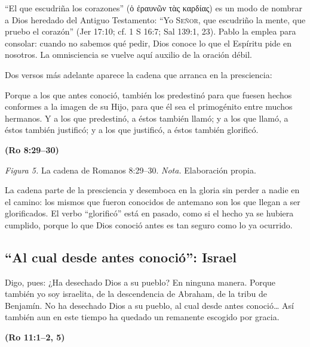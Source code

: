 \documentclass[11pt,letterpaper]{article}
\newcommand{\grc}[1]{\foreignlanguage{ancientgreek}{#1}}
\newcommand{\SENOR}{\textsc{Señor}}
\newcommand{\fuente}[1]{\par\hfill{\upshape\bfseries\small\textcolor{azul}{#1}}}
\begin{document}
``El que escudriña los corazones'' (\grc{ὁ ἐραυνῶν τὰς καρδίας}) es un modo de nombrar a Dios heredado del Antiguo Testamento: ``Yo \SENOR{}, que escudriño la mente, que pruebo el corazón'' (Jer 17:10; cf. 1 S 16:7; Sal 139:1, 23). Pablo la emplea para consolar: cuando no sabemos qué pedir, Dios conoce lo que el Espíritu pide en nosotros. La omnisciencia se vuelve aquí auxilio de la oración débil.

Dos versos más adelante aparece la cadena que arranca en la presciencia:

\begin{cita}Porque a los que antes conoció, también los predestinó para que fuesen hechos conformes a la imagen de su Hijo, para que él sea el primogénito entre muchos hermanos. Y a los que predestinó, a éstos también llamó; y a los que llamó, a éstos también justificó; y a los que justificó, a éstos también glorificó.\fuente{(Ro 8:29--30)}\end{cita}

\begin{center}
\par
{\footnotesize\color{gris}\textit{Figura 5.} La cadena de Romanos 8:29--30. \textit{Nota.} Elaboración propia.}
\end{center}

La cadena parte de la presciencia y desemboca en la gloria sin perder a nadie en el camino: los mismos que fueron conocidos de antemano son los que llegan a ser glorificados. El verbo ``glorificó'' está en pasado, como si el hecho ya se hubiera cumplido, porque lo que Dios conoció antes es tan seguro como lo ya ocurrido.

\subsection{``Al cual desde antes conoció'': Israel}

\begin{cita}Digo, pues: ¿Ha desechado Dios a su pueblo? En ninguna manera. Porque también yo soy israelita, de la descendencia de Abraham, de la tribu de Benjamín. No ha desechado Dios a su pueblo, al cual desde antes conoció\ldots{} Así también aun en este tiempo ha quedado un remanente escogido por gracia.\fuente{(Ro 11:1--2, 5)}\end{cita}
\end{document}
